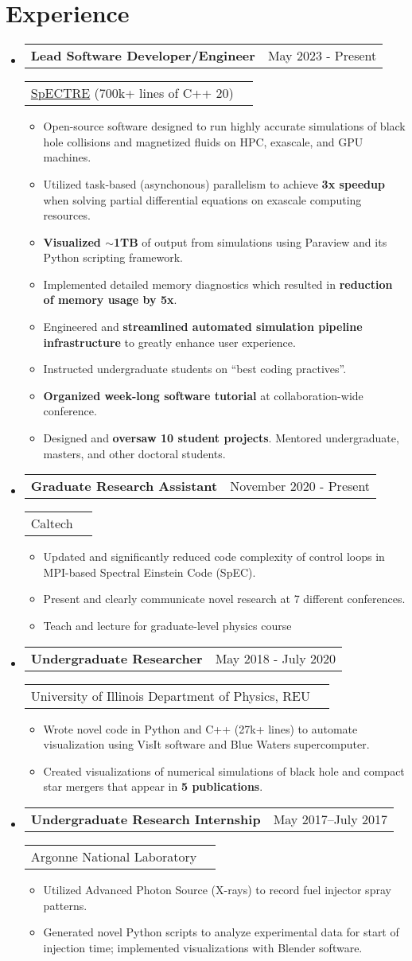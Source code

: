 \documentclass[a4paper,20pt]{article}
\makeatletter
\newcommand{\resumeItem}[1]{
  \item\small{
    #1 \vspace{-2pt}
  }
}
\newcommand{\resumeSubheading}[4]{
  \vspace{-1pt}\item
    \begin{tabular*}{0.97\textwidth}{l@{\extracolsep{\fill}}r}
      \textbf{#1} & #2 \\
    \end{tabular*}
    \begin{tabular*}{0.97\textwidth}{l@{\extracolsep{\fill}}r}
    #3 & \textit{#4} \\
    \end{tabular*}
    \vspace{-5pt}
}
\newcommand{\resumeSubHeadingListStart}{\begin{itemize}[leftmargin=*]}
\newcommand{\resumeSubHeadingListEnd}{\end{itemize}}
\newcommand{\resumeItemListStart}{\begin{itemize}}
\newcommand{\resumeItemListEnd}{\end{itemize}\vspace{-5pt}}
\makeatother
\begin{document}
\section{Experience}
  \resumeSubHeadingListStart
  \resumeSubheading{Lead Software Developer/Engineer}{May 2023 -
  Present}{\href{https://github.com/sxs-collaboration/spectre}{SpECTRE} (700k+
  lines of C++ 20)}{}
    \resumeItemListStart
  \resumeItem{Open-source software designed to run highly accurate simulations
  of black hole collisions and magnetized fluids on HPC, exascale, and GPU machines.}
  \resumeItem{Utilized task-based (asynchonous) parallelism to
  achieve \textbf{3x speedup} when solving partial differential equations on exascale
  computing resources.}
  \resumeItem{\textbf{Visualized $\sim$1TB} of output from simulations using Paraview and its
  Python scripting framework.}
  \resumeItem{Implemented detailed memory diagnostics which resulted in
  \textbf{reduction of memory usage by 5x}.}
  \resumeItem{Engineered and \textbf{streamlined automated simulation pipeline
  infrastructure} to greatly enhance user experience.}
  \resumeItem{Instructed undergraduate students on ``best coding practives''.}
  \resumeItem{\textbf{Organized week-long software tutorial} at
  collaboration-wide conference.}
  \resumeItem{Designed and \textbf{oversaw 10 student projects}. Mentored
  undergraduate, masters, and other doctoral students.}
    \resumeItemListEnd

  \resumeSubheading{Graduate Research Assistant}{November 2020 -
  Present}{Caltech}{}
    \resumeItemListStart
  \resumeItem{Updated and significantly reduced code complexity of control loops in
  MPI-based Spectral Einstein Code (SpEC).} 
  \resumeItem{Present and clearly communicate novel research at 7 different
  conferences.}
  \resumeItem{Teach and lecture for graduate-level physics course}
      \resumeItemListEnd

    \resumeSubheading{Undergraduate Researcher}{May 2018 - July 2020}{University of Illinois Department of Physics, REU}{}
    \resumeItemListStart
  \resumeItem{Wrote novel code in Python and C++ (27k+ lines) to automate visualization using
  VisIt software and Blue Waters supercomputer.}
  \resumeItem{Created visualizations of numerical simulations of black hole and
  compact star mergers that appear in \textbf{5 publications}.}
      \resumeItemListEnd

    \resumeSubheading
		{Undergraduate Research Internship}{May 2017–July 2017}
		{Argonne National Laboratory}{}
		\resumeItemListStart
        \resumeItem{Utilized Advanced Photon Source (X-rays) to record fuel injector spray patterns.}
        \resumeItem{Generated novel Python scripts to analyze experimental data for start of injection time; implemented visualizations with Blender software.}
		\resumeItemListEnd
\resumeSubHeadingListEnd
\end{document}
